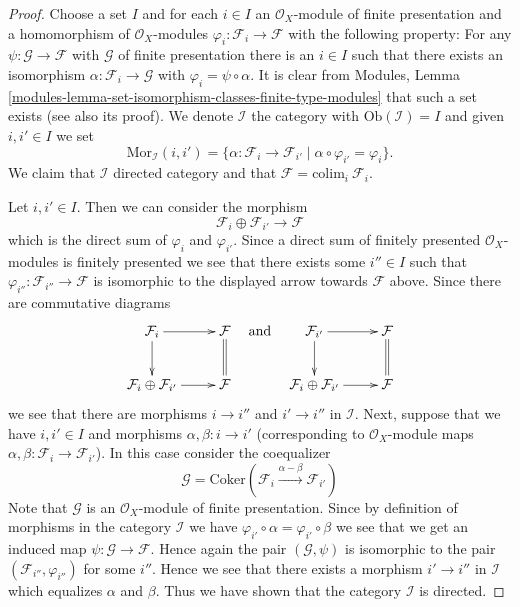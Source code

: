 \begin{proof}
Choose a set $I$ and for each $i \in I$ an $\mathcal{O}_X$-module
of finite presentation and a homomorphism of $\mathcal{O}_X$-modules
$\varphi_i : \mathcal{F}_i \to \mathcal{F}$ with the following
property: For any $\psi : \mathcal{G} \to \mathcal{F}$ with $\mathcal{G}$
of finite presentation there is an $i \in I$ such that there exists
an isomorphism $\alpha : \mathcal{F}_i \to \mathcal{G}$ with
$\varphi_i = \psi \circ \alpha$. It is clear from
Modules, Lemma \ref{modules-lemma-set-isomorphism-classes-finite-type-modules}
that such a set exists (see also its proof).
We denote $\mathcal{I}$ the category
with $\text{Ob}(\mathcal{I}) = I$ and given $i, i' \in I$ 
we set
$$
\text{Mor}_{\mathcal{I}}(i, i') =
\{\alpha : \mathcal{F}_i \to \mathcal{F}_{i'} \mid
\alpha \circ \varphi_{i'} = \varphi_i
\}.
$$
We claim that $\mathcal{I}$ directed category and that
$\mathcal{F} = \text{colim}_i\ \mathcal{F}_i$.

\medskip\noindent
Let $i, i' \in I$. Then we can consider the morphism
$$
\mathcal{F}_i \oplus \mathcal{F}_{i'} \longrightarrow \mathcal{F}
$$
which is the direct sum of $\varphi_i$ and $\varphi_{i'}$.
Since a direct sum of finitely presented $\mathcal{O}_X$-modules
is finitely presented we see that there exists some $i'' \in I$
such that $\varphi_{i''} : \mathcal{F}_{i''} \to \mathcal{F}$
is isomorphic to the displayed arrow towards $\mathcal{F}$ above.
Since there are commutative diagrams
$$
\xymatrix{
\mathcal{F}_i \ar[r] \ar[d] & \mathcal{F} \ar@{=}[d] \\
\mathcal{F}_i \oplus \mathcal{F}_{i'} \ar[r] & \mathcal{F}
}
\quad
\text{and}
\quad
\xymatrix{
\mathcal{F}_{i'} \ar[r] \ar[d] & \mathcal{F} \ar@{=}[d] \\
\mathcal{F}_i \oplus \mathcal{F}_{i'} \ar[r] & \mathcal{F}
}
$$
we see that there are morphisms $i \to i''$ and $i' \to i''$
in $\mathcal{I}$. Next, suppose that we have $i, i' \in I$ and
morphisms $\alpha, \beta : i \to i'$ (corresponding to $\mathcal{O}_X$-module
maps $\alpha, \beta : \mathcal{F}_i \to \mathcal{F}_{i'}$).
In this case consider the coequalizer
$$
\mathcal{G} =
\text{Coker}(
\mathcal{F}_i \xrightarrow{\alpha - \beta} \mathcal{F}_{i'}
)
$$
Note that $\mathcal{G}$ is an $\mathcal{O}_X$-module of finite presentation.
Since by definition of morphisms in the category $\mathcal{I}$
we have $\varphi_{i'} \circ \alpha = \varphi_{i'} \circ \beta$
we see that we get an induced map $\psi : \mathcal{G} \to \mathcal{F}$.
Hence again the pair $(\mathcal{G}, \psi)$ is isomorphic to
the pair $(\mathcal{F}_{i''}, \varphi_{i''})$ for some $i''$.
Hence we see that there exists a morphism $i' \to i''$ in
$\mathcal{I}$ which equalizes $\alpha$ and $\beta$. Thus we have
shown that the category $\mathcal{I}$ is directed.


\end{proof}
